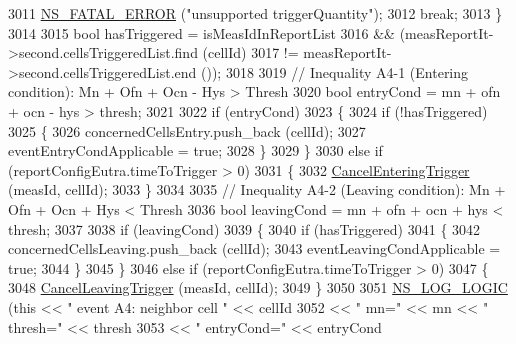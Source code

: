 \begin{DoxyCode}
3011                 \hyperlink{group__fatal_ga5131d5e3f75d7d4cbfd706ac456fdc85}{NS\_FATAL\_ERROR} (\textcolor{stringliteral}{"unsupported triggerQuantity"});
3012                 \textcolor{keywordflow}{break};
3013               \}
3014 
3015             \textcolor{keywordtype}{bool} hasTriggered = isMeasIdInReportList
3016               && (measReportIt->second.cellsTriggeredList.find (cellId)
3017                   != measReportIt->second.cellsTriggeredList.end ());
3018 
3019             \textcolor{comment}{// Inequality A4-1 (Entering condition): Mn + Ofn + Ocn - Hys > Thresh}
3020             \textcolor{keywordtype}{bool} entryCond = mn + ofn + ocn - hys > thresh;
3021 
3022             \textcolor{keywordflow}{if} (entryCond)
3023               \{
3024                 \textcolor{keywordflow}{if} (!hasTriggered)
3025                   \{
3026                     concernedCellsEntry.push\_back (cellId);
3027                     eventEntryCondApplicable = \textcolor{keyword}{true};
3028                   \}
3029               \}
3030             \textcolor{keywordflow}{else} \textcolor{keywordflow}{if} (reportConfigEutra.timeToTrigger > 0)
3031               \{
3032                 \hyperlink{classns3_1_1LteUeRrc_a9221d85411de5dd375b71b44e3331c5c}{CancelEnteringTrigger} (measId, cellId);
3033               \}
3034 
3035             \textcolor{comment}{// Inequality A4-2 (Leaving condition): Mn + Ofn + Ocn + Hys < Thresh}
3036             \textcolor{keywordtype}{bool} leavingCond = mn + ofn + ocn + hys < thresh;
3037 
3038             \textcolor{keywordflow}{if} (leavingCond)
3039               \{
3040                 \textcolor{keywordflow}{if} (hasTriggered)
3041                   \{
3042                     concernedCellsLeaving.push\_back (cellId);
3043                     eventLeavingCondApplicable = \textcolor{keyword}{true};
3044                   \}
3045               \}
3046             \textcolor{keywordflow}{else} \textcolor{keywordflow}{if} (reportConfigEutra.timeToTrigger > 0)
3047               \{
3048                 \hyperlink{classns3_1_1LteUeRrc_a3e35c475cfb5361222f1556bfbd3111d}{CancelLeavingTrigger} (measId, cellId);
3049               \}
3050 
3051             \hyperlink{group__logging_ga88acd260151caf2db9c0fc84997f45ce}{NS\_LOG\_LOGIC} (\textcolor{keyword}{this} << \textcolor{stringliteral}{" event A4: neighbor cell "} << cellId
3052                                << \textcolor{stringliteral}{" mn="} << mn << \textcolor{stringliteral}{" thresh="} << thresh
3053                                << \textcolor{stringliteral}{" entryCond="} << entryCond

\end{DoxyCode}
